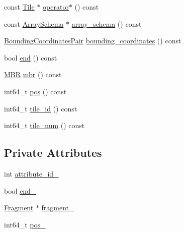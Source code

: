 \begin{DoxyCompactItemize}
\item 
const \hyperlink{classTile}{Tile} $\ast$ \hyperlink{classStorageManager_1_1Fragment_1_1const__reverse__tile__iterator_a97543467c2c1b6b0bd3cd9cbed7ec476}{operator$\ast$} () const 
\item 
const \hyperlink{classArraySchema}{Array\+Schema} $\ast$ \hyperlink{classStorageManager_1_1Fragment_1_1const__reverse__tile__iterator_a67865af649fff83ac00d56a2e161c940}{array\+\_\+schema} () const 
\item 
\hyperlink{classStorageManager_a2b31e8ccd7a9daa2cf5f9fbf12080667}{Bounding\+Coordinates\+Pair} \hyperlink{classStorageManager_1_1Fragment_1_1const__reverse__tile__iterator_ad95c1c93467a030df2af08ffae8ca435}{bounding\+\_\+coordinates} () const 
\item 
bool \hyperlink{classStorageManager_1_1Fragment_1_1const__reverse__tile__iterator_a54e13d1a02ff35c65339416268c7b122}{end} () const 
\item 
\hyperlink{classStorageManager_abb895595763203bac1236a1e5886ae91}{M\+B\+R} \hyperlink{classStorageManager_1_1Fragment_1_1const__reverse__tile__iterator_a633f28857e3070a46eeba237e7e57145}{mbr} () const 
\item 
int64\+\_\+t \hyperlink{classStorageManager_1_1Fragment_1_1const__reverse__tile__iterator_a85167ad3a57775d0671e4fa8b5d2490f}{pos} () const 
\item 
int64\+\_\+t \hyperlink{classStorageManager_1_1Fragment_1_1const__reverse__tile__iterator_a9d6964964524b9d1f08df78aee212980}{tile\+\_\+id} () const 
\item 
int64\+\_\+t \hyperlink{classStorageManager_1_1Fragment_1_1const__reverse__tile__iterator_a5b50f142d38d436a39f2fa57aea0b2ca}{tile\+\_\+num} () const 
\end{DoxyCompactItemize}
\subsection*{Private Attributes}
\begin{DoxyCompactItemize}
\item 
int \hyperlink{classStorageManager_1_1Fragment_1_1const__reverse__tile__iterator_ab3f8096e66c5d10e85774031d9e9e718}{attribute\+\_\+id\+\_\+}
\item 
bool \hyperlink{classStorageManager_1_1Fragment_1_1const__reverse__tile__iterator_a11fa347d5372df1fd1c2de595224989a}{end\+\_\+}
\item 
\hyperlink{classStorageManager_1_1Fragment}{Fragment} $\ast$ \hyperlink{classStorageManager_1_1Fragment_1_1const__reverse__tile__iterator_a877b80928d750c0a61d04dcc731419f7}{fragment\+\_\+}
\item 
int64\+\_\+t \hyperlink{classStorageManager_1_1Fragment_1_1const__reverse__tile__iterator_afd9408dff860daf1244b0a29eac3d2ed}{pos\+\_\+}
\end{DoxyCompactItemize}


